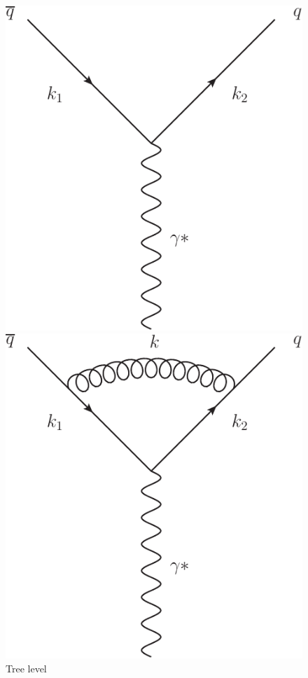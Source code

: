 	\begin{figure}[tpb]
		\centering
			\begin{minipage}{0.4\linewidth}
				\centering
				\includegraphics[width=0.98\linewidth]{TreeLevel}
				\caption{Tree level}
				\label{fig:NLOfig_1}
			\end{minipage}
			\begin{minipage}{0.4\linewidth}
				\centering
				\includegraphics[width=0.98\linewidth]{NLOVirtual}

\end{minipage}
\end{figure}
